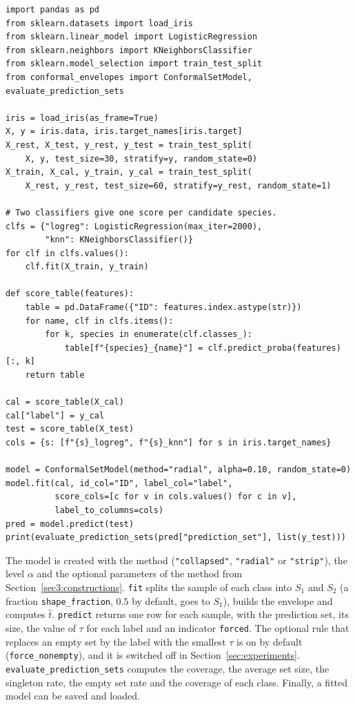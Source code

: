 {\footnotesize
\begin{verbatim}
import pandas as pd
from sklearn.datasets import load_iris
from sklearn.linear_model import LogisticRegression
from sklearn.neighbors import KNeighborsClassifier
from sklearn.model_selection import train_test_split
from conformal_envelopes import ConformalSetModel, evaluate_prediction_sets

iris = load_iris(as_frame=True)
X, y = iris.data, iris.target_names[iris.target]
X_rest, X_test, y_rest, y_test = train_test_split(
    X, y, test_size=30, stratify=y, random_state=0)
X_train, X_cal, y_train, y_cal = train_test_split(
    X_rest, y_rest, test_size=60, stratify=y_rest, random_state=1)

# Two classifiers give one score per candidate species.
clfs = {"logreg": LogisticRegression(max_iter=2000),
        "knn": KNeighborsClassifier()}
for clf in clfs.values():
    clf.fit(X_train, y_train)

def score_table(features):
    table = pd.DataFrame({"ID": features.index.astype(str)})
    for name, clf in clfs.items():
        for k, species in enumerate(clf.classes_):
            table[f"{species}_{name}"] = clf.predict_proba(features)[:, k]
    return table

cal = score_table(X_cal)
cal["label"] = y_cal
test = score_table(X_test)
cols = {s: [f"{s}_logreg", f"{s}_knn"] for s in iris.target_names}

model = ConformalSetModel(method="radial", alpha=0.10, random_state=0)
model.fit(cal, id_col="ID", label_col="label",
          score_cols=[c for v in cols.values() for c in v],
          label_to_columns=cols)
pred = model.predict(test)
print(evaluate_prediction_sets(pred["prediction_set"], list(y_test)))
\end{verbatim}
}


The model is created with the method (\texttt{"collapsed"}, \texttt{"radial"} or \texttt{"strip"}), the level $\alpha$ and 
the optional parameters of the method from Section~\ref{sec3:constructions}. \texttt{fit} splits the sample of each class 
into $S_1$ and $S_2$ (a fraction \texttt{shape\_fraction}, $0.5$ by default, goes to $S_1$), builds the envelope and 
computes $\hat t$. \texttt{predict} returns one row for each sample, with the prediction set, its size, the value of $\tau$ 
for each label and an indicator \texttt{forced}. The optional rule that replaces an empty set by the label with the smallest 
$\tau$ is on by default (\texttt{force\_nonempty}), and it is switched off in Section~\ref{sec:experiments}. 
\texttt{evaluate\_prediction\_sets} computes the coverage, the average set size, the singleton rate, the empty set rate and 
the coverage of each class. Finally, a fitted model can be saved and loaded.

